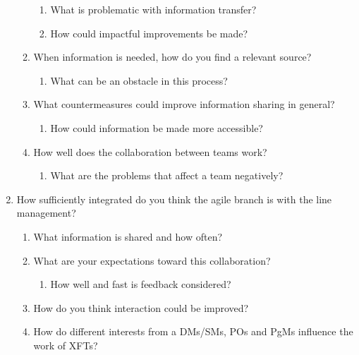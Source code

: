 \begin{enumerate}
\begin{enumerate}
        \begin{enumerate}
          \item What is problematic with information transfer?
          \item How could impactful improvements be made?
        \end{enumerate}
      
      \item When information is needed, how do you find a relevant source?
      
        \begin{enumerate}
          \item What can be an obstacle in this process?
        \end{enumerate}
      
      \item What countermeasures could improve information sharing in general?
      
        \begin{enumerate}
          \item How could information be made more accessible?
        \end{enumerate}
      
      \item How well does the collaboration between teams work?
      
        \begin{enumerate}
          \item What are the problems that affect a team negatively?
        \end{enumerate}
   \end{enumerate}
  
  \item How sufficiently integrated do you think the agile branch is with the line management?
  
  \begin{enumerate}
   \item What information is shared and how often?
   \item What are your expectations toward this collaboration?
    
      \begin{enumerate}
      \item How well and fast is feedback considered?
     \end{enumerate}
      
    \item How do you think interaction could be improved?
    \item How do different interests from a DMs/SMs, POs and PgMs influence the work of XFTs?
    

\end{enumerate}
\end{enumerate}
